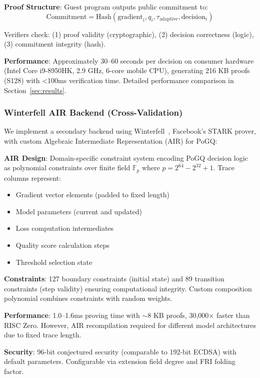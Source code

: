 \textbf{Proof Structure}: Guest program outputs public commitment to:
\begin{equation}
\text{Commitment} = \text{Hash}(\text{gradient}_i, q_i, \tau_{\text{adaptive}}, \text{decision}_i)
\end{equation}

Verifiers check: (1) proof validity (cryptographic), (2) decision correctness (logic), (3) commitment integrity (hash).

\textbf{Performance}: Approximately 30--60 seconds per decision on consumer hardware (Intel Core i9-8950HK, 2.9 GHz, 6-core mobile CPU), generating 216 KB proofs (S128) with <100ms verification time. Detailed performance comparison in Section~\ref{sec:results}.

\subsubsection{Winterfell AIR Backend (Cross-Validation)}

We implement a secondary backend using Winterfell~\cite{winterfell}, Facebook's STARK prover, with custom Algebraic Intermediate Representation (AIR) for PoGQ:

\textbf{AIR Design}: Domain-specific constraint system encoding PoGQ decision logic as polynomial constraints over finite field $\mathbb{F}_{p}$ where $p = 2^{64} - 2^{32} + 1$. Trace columns represent:
\begin{itemize}
    \item Gradient vector elements (padded to fixed length)
    \item Model parameters (current and updated)
    \item Loss computation intermediates
    \item Quality score calculation steps
    \item Threshold selection state
\end{itemize}

\textbf{Constraints}: 127 boundary constraints (initial state) and 89 transition constraints (step validity) ensuring computational integrity. Custom composition polynomial combines constraints with random weights.

\textbf{Performance}: 1.0--1.6ms proving time with $\sim$8 KB proofs, 30,000$\times$ faster than RISC Zero. However, AIR recompilation required for different model architectures due to fixed trace length.

\textbf{Security}: 96-bit conjectured security (comparable to 192-bit ECDSA) with default parameters. Configurable via extension field degree and FRI folding factor.

